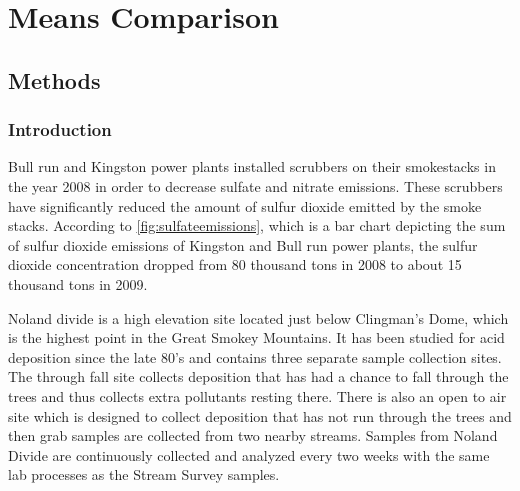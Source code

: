 \chapter{Means Comparison}\label{ch:mc}

\section{Methods}

\subsection{Introduction}
Bull run and Kingston power plants installed scrubbers on their smokestacks in the year 2008 in order to decrease sulfate and nitrate emissions.
These scrubbers have significantly reduced the amount of sulfur dioxide emitted by the smoke stacks.
According to \autoref{fig:sulfateemissions}, which is a bar chart depicting the sum of sulfur dioxide emissions of Kingston and Bull run power plants,  the sulfur dioxide concentration dropped from 80 thousand tons in 2008 to about 15 thousand tons in 2009.

Noland divide is a high elevation site located just below Clingman's Dome, which is the highest point in the Great Smokey Mountains.  
It has been studied for acid deposition since the late 80's and contains three separate sample collection sites.
The through fall site collects deposition that has had a chance to fall through the trees and thus collects extra pollutants resting there.
There is also an open to air site which is designed to collect deposition that has not run through the trees and then grab samples are collected from two nearby streams.
Samples from Noland Divide are continuously collected and analyzed every two weeks with the same lab processes as the Stream Survey samples.


